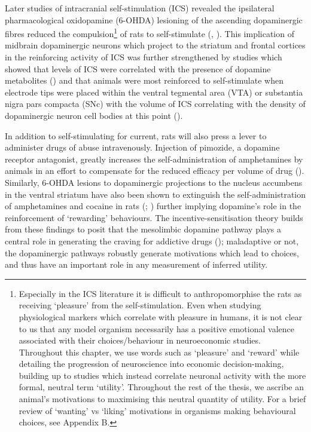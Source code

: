 Later studies of intracranial self-stimulation (ICS) revealed the ipsilateral pharmacological oxidopamine (6-OHDA) lesioning of the ascending dopaminergic fibres reduced the compulsion\footnote{  Especially in the ICS literature it is difficult to anthropomorphise the rats as receiving ‘pleasure’ from the self-stimulation. Even when studying physiological markers which correlate with pleasure in humans, it is not clear to us that any model organism necessarily has a positive emotional valence associated with their choices/behaviour in neuroeconomic studies. Throughout this chapter, we use words such as ‘pleasure’ and ‘reward’ while detailing the progression of neuroscience into economic decision-making, building up to studies which instead correlate neuronal activity with the more formal, neutral term ‘utility’. Throughout the rest of the thesis, we ascribe an animal’s motivations to maximising this neutral quantity of utility. For a brief review of ‘wanting’ vs ‘liking’ motivations in organisms making behavioural choices, see Appendix B.} of rats to self-stimulate (\cite{fibigerRoleDopamineIntracranial1987}, \cite{phillipsDopaminergicSubstratesIntracranial1976}). This implication of midbrain dopaminergic neurons which project to the striatum and frontal cortices in the reinforcing activity of ICS was further strengthened by studies which showed that levels of ICS were correlated with the presence of dopamine metabolites (\cite{fibigerRoleDopamineIntracranial1987}) and that animals were most reinforced to self-stimulate when electrode tips were placed within the ventral tegmental area (VTA) or substantia nigra pars compacta (SNc) with the volume of ICS correlating with the density of dopaminergic neuron cell bodies at this point (\cite{corbettIntracranialSelfstimulationRelation1980}).

In addition to self-stimulating for current, rats will also press a lever to administer drugs of abuse intravenously. Injection of pimozide, a dopamine receptor antagonist, greatly increases the self-administration of amphetamines by animals in an effort to compensate for the reduced efficacy per volume of drug (\cite{yokelIncreasedLeverPressing1975}). Similarly, 6-OHDA lesions to dopaminergic projections to the nucleus accumbens in the ventral striatum have also been shown to extinguish the self-administration of amphetamines and cocaine in rats (\cite{lynessDestructionDopaminergicNerve1979}; \cite{robertsExtinctionRecoveryCocaine1980}) further implying dopamine’s role in the reinforcement of ‘rewarding’ behaviours. The incentive-sensitisation theory builds from these findings to posit that the mesolimbic dopamine pathway plays a central role in generating the craving for addictive drugs (\cite{robinsonNeuralBasisDrug1993}); maladaptive or not, the dopaminergic pathways robustly generate motivations which lead to choices, and thus have an important role in any measurement of inferred utility.

